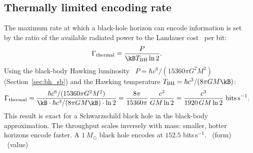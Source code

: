\subsection{Thermally limited encoding rate}
The maximum rate at which a black-hole horizon can encode information is set by the ratio of the available radiated power to the Landauer cost~\cite{Landauer1961} per
bit:
\begin{equation}
\Gamma_{\rm thermal}=\frac{P}{\kB T_{\rm BH}\ln2}.\label{eq:bh_gamma_def}
\end{equation}
Using the black-body Hawking luminosity~\cite{Hawking1975} $P=\hbar c^6/(15360\pi G^2M^2)$ (Section~\ref{sec:bh_sb}) and the Hawking temperature $T_{\rm BH}=\hbar c^3/(8\pi GM\kB)$:
\begin{equation}
\Gamma_{\rm thermal}=\frac{\hbar c^6/(15360\pi G^2M^2)}{\kB\cdot\hbar c^3/(8\pi GM\kB)\cdot\ln2}=\frac{8\pi}{15360\pi}\,\frac{c^3}{GM\ln2}=\frac{c^3}{1920\,GM\ln2}\ \text{bits\,s}^{-1}.\label{eq:bh_gamma}
\end{equation}
This result is exact for a Schwarzschild black hole in the black-body approximation. The throughput scales inversely with mass: smaller, hotter horizons
encode faster. A $1\,M_\odot$ black hole encodes at $152.5$ bits\,s$^{-1}$. \derived\ (form) \calc\ (value)

